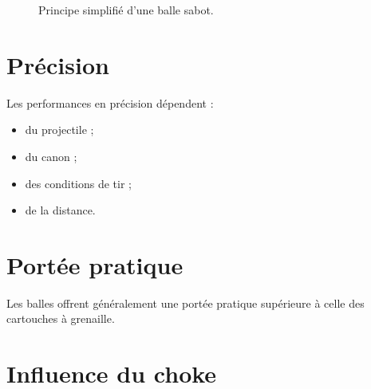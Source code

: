\begin{figure}[htbp]
\centering


\caption{Principe simplifié d'une balle sabot.}
\label{fig:balle_sabot}

\end{figure}

\section{Précision}

Les performances en précision dépendent :

\begin{itemize}
    \item du projectile ;
    \item du canon ;
    \item des conditions de tir ;
    \item de la distance.
\end{itemize}

\section{Portée pratique}

Les balles offrent généralement une portée pratique supérieure à celle des
cartouches à grenaille.

\section{Influence du choke}

